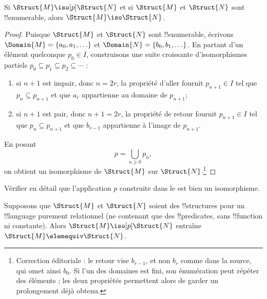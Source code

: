 \documentclass[../../../include/open-logic-section]{subfiles}
\begin{document}
\begin{thm}
  Si $\Struct{M} \iso[p] \Struct{N}$ et si $\Struct{M}$ et
  $\Struct{N}$ sont !!{enumerable}, alors $\Struct{M} \iso
  \Struct{N}$.
\end{thm}

\begin{proof}
  Puisque $\Struct{M}$ et $\Struct{N}$ sont !!{enumerable},
  écrivons $\Domain{M} = \{a_0, a_1, \ldots \}$ et
  $\Domain{N} = \{b_0, b_1, \ldots \}$. En partant d'un élément
  quelconque $p_0 \in I$, construisons une suite croissante
  d'isomorphismes partiels
  $p_0 \subseteq p_1 \subseteq p_2 \subseteq \cdots$ :
  \begin{enumerate}
  \item si $n+1$ est impair, donc $n = 2r$, la propriété d'aller
    fournit $p_{n+1} \in I$ tel que $p_n \subseteq p_{n+1}$
    et que $a_r$ appartienne au domaine de $p_{n+1}$;
  \item si $n+1$ est pair, donc $n+1 =2r$, la propriété de retour
    fournit $p_{n+1} \in I$ tel que $p_n \subseteq p_{n+1}$
    et que $b_{r-1}$ appartienne à l'image de $p_{n+1}$.
  \end{enumerate}
En posant
\[
p = \bigcup_{n\ge 0} p_n,
\]
on obtient un isomorphisme de $\Struct{M}$ sur $\Struct{N}$.\footnote{Correction éditoriale : le retour vise $b_{r-1}$, et non $b_r$ comme dans la source, qui omet ainsi $b_0$. Si l'un des domaines est fini, son énumération peut répéter des éléments ; les deux propriétés permettent alors de garder un prolongement déjà obtenu.}
\end{proof}

\begin{prob}
  Vérifier en détail que l'application $p$ construite dans le
   est bien un isomorphisme.
\end{prob}

\begin{thm}
  Supposons que $\Struct{M}$ et $\Struct{N}$ soient des !!{structure}s
  pour un !!{language} purement relationnel (ne contenant que des
  !!{predicate}s, sans !!{function} ni constante). Alors
  $\Struct{M} \iso[p] \Struct{N}$ entraîne
  $\Struct{M} \elemequiv \Struct{N}$.
\end{thm}
\end{document}
